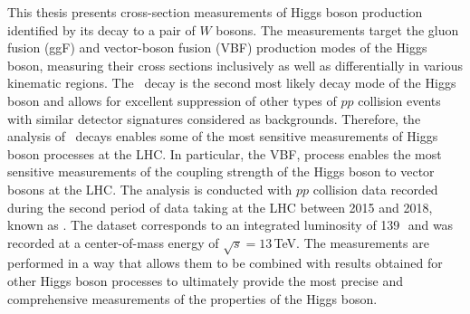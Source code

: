 This thesis presents cross-section measurements of Higgs boson production identified by its decay to a pair of $W$ bosons.
The measurements target the gluon fusion (ggF) and vector-boson fusion (VBF) production modes of the Higgs boson, measuring their cross sections inclusively as well as differentially in various kinematic regions.
The \HWW\ decay is the second most likely decay mode of the Higgs boson and allows for excellent suppression of other types of $pp$ collision events with similar detector signatures considered as backgrounds. Therefore, the analysis of \HWW\ decays enables some of the most sensitive measurements of Higgs boson processes at the LHC. 
In particular, the VBF, \HWW process enables the most sensitive measurements of the coupling strength of the Higgs boson to vector bosons at the LHC. 
The analysis is conducted with $pp$ collision data recorded during the second period of data taking at the LHC between 2015 and 2018, known as \RunTwo. The dataset corresponds to an integrated luminosity of 139\,\ifb\ and was recorded at a center-of-mass energy of $\sqrt{s} = 13\,$TeV.
The measurements are performed in a way that allows them to be combined with results obtained for other Higgs boson processes to ultimately provide the most precise and comprehensive measurements of the properties of the Higgs boson.

